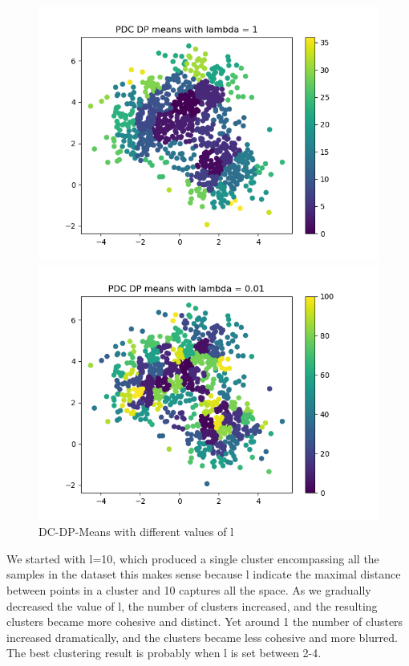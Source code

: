 \documentclass[12pt]{article}
\begin{document}
\begin{figure}[!h]
\begin{minipage}{0.5\textwidth}
    \includegraphics[scale=0.4]{images/task2_dlv__l1}
    \end{minipage}
    \begin{minipage}{0.5\textwidth}
    \centering
    \includegraphics[scale=0.4]{images/task2_dlv__l0.01}
    \end{minipage}
    \caption{DC-DP-Means with different values of l}\label{fig:figure6}
\end{figure}
 We started with l=10, which produced a single cluster encompassing all the samples in the dataset this makes sense
 because l indicate the maximal distance between points in a cluster and 10 captures all the space.
 As we gradually decreased the value of l, the number of clusters increased, and the resulting clusters became more cohesive and distinct.
 Yet around 1 the number of clusters increased dramatically, and the clusters became less cohesive and more blurred.
 The best clustering result is probably when l is set between 2-4.
\pagebreak
\end{document}
